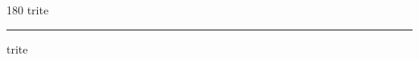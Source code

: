 
\begin{frame}
\begin{center}
\begin{turn}{180}
{\fontsize{2.5cm}{1em}\selectfont trite}
\end{turn}
\vspace{1em}\par  
\hrule
\vspace{1em}\par  
{\fontsize{2.5cm}{1em}\selectfont trite}
\end{center}
\end{frame}
